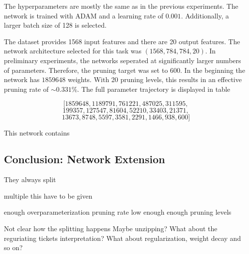 The hyperparameters are mostly the same as in the previous experiments.
The network is trained with ADAM and a learning rate of $0.001$.
Additionally, a larger batch size of 128 is selected.

The dataset provides 1568 input features and there are 20 output features. 
The network architecture selected for this task was $(1568, 784, 784, 20)$.
In preliminary experiments, the networks seperated at significantly larger numbers of parameters.
Therefore, the pruning target was set to 600.
In the beginning the network has $1859648$ weights.
With 20 pruning levels, this results in an effective pruning rate of $\sim0.331$\%.
The full parameter trajectory is displayed in table

\[
\big[1859648, 1189791, 761221, 487025, 311595, 
\]
\[
199357, 127547, 81604, 52210, 33403,21371,
\]
\[
13673, 8748, 5597, 3581, 2291, 1466, 938, 600\big]    
\]





This network contains

\subsection{Conclusion: Network Extension}
They always split

multiple this have to be given

enough overparameterization
pruning rate low enough
enough pruning levels

Not clear how the splitting happens
Maybe unzipping?
What about the reguriating tickets interpretation?
What about regularization, weight decay and so on?
